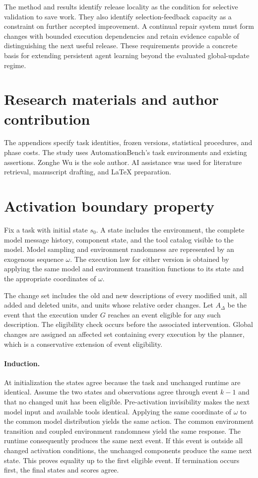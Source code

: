 \documentclass{ecai}
\begin{document}
The method and results identify release locality as the condition for selective validation to save work. They also identify selection-feedback capacity as a constraint on further accepted improvement. A continual repair system must form changes with bounded execution dependencies and retain evidence capable of distinguishing the next useful release. These requirements provide a concrete basis for extending persistent agent learning beyond the evaluated global-update regime.

\section*{Research materials and author contribution}
The appendices specify task identities, frozen versions, statistical procedures, and phase costs. The study uses AutomationBench's task environments and existing assertions. Zonghe Wu is the sole author. AI assistance was used for literature retrieval, manuscript drafting, and LaTeX preparation.



\clearpage
\appendix
\section{Activation boundary property}
\label{app:proof}

Fix a task with initial state $s_0$. A state includes the environment, the complete model message history, component state, and the tool catalog visible to the model. Model sampling and environment randomness are represented by an exogenous sequence $\omega$. The execution law for either version is obtained by applying the same model and environment transition functions to its state and the appropriate coordinates of $\omega$.

The change set includes the old and new descriptions of every modified unit, all added and deleted units, and units whose relative order changes. Let $A_\Delta$ be the event that the execution under $G$ reaches an event eligible for any such description. The eligibility check occurs before the associated intervention. Global changes are assigned an affected set containing every execution by the planner, which is a conservative extension of event eligibility.

\paragraph{Induction.}
At initialization the states agree because the task and unchanged runtime are identical. Assume the two states and observations agree through event $k-1$ and that no changed unit has been eligible. Pre-activation invisibility makes the next model input and available tools identical. Applying the same coordinate of $\omega$ to the common model distribution yields the same action. The common environment transition and coupled environment randomness yield the same response. The runtime consequently produces the same next event. If this event is outside all changed activation conditions, the unchanged components produce the same next state. This proves equality up to the first eligible event. If termination occurs first, the final states and scores agree.
\end{document}
